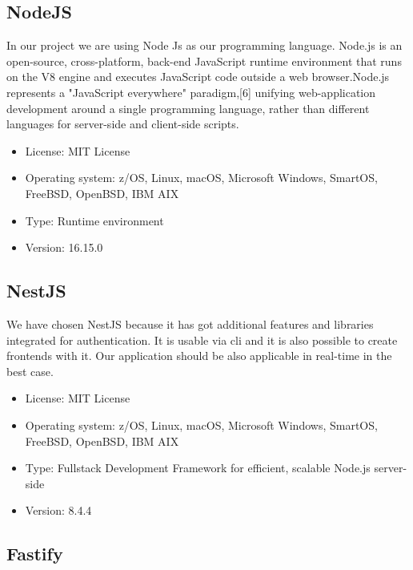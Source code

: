\documentclass[12pt, a4paper]{article}
\begin{document}
\subsection*{NodeJS}


In our project we are using Node Js as our programming language. Node.js is an open-source, cross-platform, back-end JavaScript runtime environment that runs on the V8 engine and executes JavaScript code outside a web browser.Node.js represents a "JavaScript everywhere" paradigm,[6] unifying web-application development around a single programming language, rather than different languages for server-side and client-side scripts.

\begin{itemize}
    \item License: MIT License
    \item Operating system: z/OS, Linux, macOS, Microsoft Windows, SmartOS, FreeBSD, OpenBSD, IBM AIX
    \item Type: Runtime environment
    \item Version: 16.15.0
\end{itemize}


\subsection*{NestJS}



We have chosen NestJS because it has got additional features and libraries integrated for authentication. It is usable via cli and it is also possible to create frontends with it. Our application should be also applicable in real-time in the best case. 

\begin{itemize}
    \item License: MIT License
    \item Operating system: z/OS, Linux, macOS, Microsoft Windows, SmartOS, FreeBSD, OpenBSD, IBM AIX
    \item Type: Fullstack Development Framework for efficient, scalable Node.js server-side 
    \item Version: 8.4.4
\end{itemize}

\subsection*{Fastify}
\end{document}
